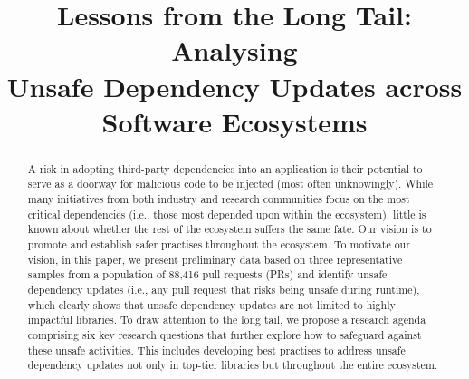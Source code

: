\documentclass[sigconf,screen]{acmart}
\begin{document}
\begin{sloppy}


\title{Lessons from the Long Tail: Analysing \\ Unsafe Dependency Updates across Software Ecosystems}


\begin{abstract}
A risk in adopting third-party dependencies into an application is their potential to serve as a doorway for malicious code to be injected (most often unknowingly).
While many initiatives from both industry and research communities focus on the most critical dependencies (i.e., those most depended upon within the ecosystem), little is known about whether the rest of the ecosystem suffers the same fate. Our vision is to promote and establish safer practises throughout the ecosystem.
To motivate our vision, in this paper, we present preliminary data based on three representative samples from a population of 88,416 pull requests (PRs) and identify unsafe dependency updates (i.e., any pull request that risks being unsafe during runtime), which clearly shows that unsafe dependency updates are not limited to highly impactful libraries.
To draw attention to the long tail, we propose a research agenda comprising six key research questions that further explore how to safeguard against these unsafe activities. This includes developing best practises to address unsafe dependency updates not only in top-tier libraries but throughout the entire ecosystem.
\end{abstract}


\end{sloppy}
\end{document}
